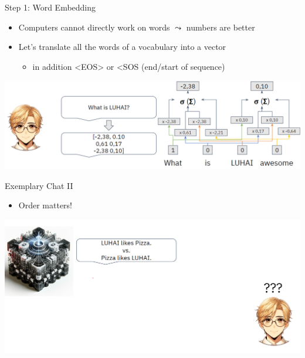 \documentclass[aspectratio=169]{../latex_main/tntbeamer}  %
\begin{document}
        \begin{frame}{Step 1: Word Embedding}

            \begin{itemize}
                \item Computers cannot directly work on words $\leadsto$ numbers are better
                \item Let's translate all the words of a vocabulary into a vector
                \begin{itemize}
                    \item in addition <EOS> or <SOS (end/start of sequence)
                \end{itemize}
            \end{itemize}

            \centering
            \includegraphics[width=1\linewidth]{figure/transformer2.png}
        
        \end{frame}

        \begin{frame}{Exemplary Chat II}

            \begin{itemize}
                \item Order matters!
            \end{itemize}

            \centering
            \includegraphics[width=0.9\linewidth]{figure/transformer3.png}
        
        \end{frame}
\end{document}
